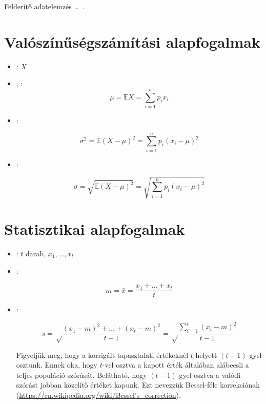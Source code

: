 
\graphicspath{ {./felderito-adatelemzes/figures/} }

Felderítő adatelemzés \ldots~\cite{tukey77}.

\section{Valószínűségszámítási alapfogalmak}

\begin{definicio}
\begin{itemize}
\item {}: $X$
\item {}, :
$$\mu = \mathbb{E}X = \sum_{i=1}^{n} p_i x_i$$

\item {}:

$$\sigma^2 = \mathbb{E}\left(X-\mu\right)^2 = \sum_{i=1}^{n} p_i (x_i - \mu)^2$$

\item {}:

$$\sigma = \sqrt{\mathbb{E}\left(X-\mu\right)^2} = \sqrt{\sum_{i=1}^{n} p_i (x_i - \mu)^2}$$
\end{itemize}
\end{definicio}

\section{Statisztikai alapfogalmak}

\begin{definicio}
	\begin{itemize}
		\item {}: $t$ darab, $x_1, \dots, x_t$
		\item {}:

		$$m = \bar{x} = \frac{x_1 + \dots + x_t}{t}$$

		\item {}:

		$$s = \sqrt\frac{\left(x_1-m\right)^2 + \dots + \left(x_t-m\right)^2}{t-1} = \sqrt\frac{\sum_{i=1}^{t}\left(x_i - m\right)^2}{t-1}$$

		Figyeljük meg, hogy a korrigált tapasztalati értékeknél $t$ helyett $(t-1)$-gyel osztunk. Ennek oka, hogy $t$-vel osztva a kapott érték általában alábecsli a teljes populáció szórását. Belátható, hogy $(t-1)$-gyel osztva a valódi szórást jobban közelítő értéket kapunk. Ezt nevezzük Bessel-féle korrekciónak (\url{https://en.wikipedia.org/wiki/Bessel's\_correction}).
		\end{itemize}
	\end{definicio}

